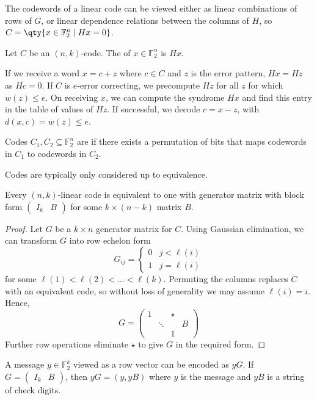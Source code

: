The codewords of a linear code can be viewed either as linear combinations of rows of $G$, or linear dependence relations between the columns of $H$, so $C = \qty{x \in \mathbb F_2^n \mid H x = 0}$.
\begin{definition}
    Let $C$ be an $(n, k)$-code.
    The  of $x \in \mathbb F_2^n$ is $Hx$.
\end{definition}
If we receive a word $x = c + z$ where $c \in C$ and $z$ is the error pattern, $Hx = Hz$ as $Hc = 0$.
If $C$ is $e$-error correcting, we precompute $Hz$ for all $z$ for which $w(z) \leq e$.
On receiving $x$, we can compute the syndrome $Hx$ and find this entry in the table of values of $Hz$.
If successful, we decode $c = x - z$, with $d(x,c) = w(z) \leq e$.
\begin{definition}
    Codes $C_1, C_2 \subseteq \mathbb F_2^n$ are  if there exists a permutation of bits that maps codewords in $C_1$ to codewords in $C_2$.
\end{definition}
Codes are typically only considered up to equivalence.
\begin{lemma}
    Every $(n, k)$-linear code is equivalent to one with generator matrix with block form $\begin{pmatrix}
        I_k & B
    \end{pmatrix}$ for some $k \times (n - k)$ matrix $B$.
\end{lemma}
\begin{proof}
    Let $G$ be a $k \times n$ generator matrix for $C$.
    Using Gaussian elimination, we can transform $G$ into row echelon form
    \[ G_{ij} = \begin{cases}
        0 & j < \ell(i) \\
        1 & j = \ell(i)
    \end{cases} \]
    for some $\ell(1) < \ell(2) < \dots < \ell(k)$.
    Permuting the columns replaces $C$ with an equivalent code, so without loss of generality we may assume $\ell(i) = i$.
    Hence,
    \[ G = \begin{pmatrix}
        1 & & \star \\
        & \ddots & & B \\
        & & 1
    \end{pmatrix} \]
    Further row operations eliminate $\star$ to give $G$ in the required form.
\end{proof}
A message $y \in \mathbb F_2^k$ viewed as a row vector can be encoded as $yG$.
If $G = \begin{pmatrix}
    I_k & B
\end{pmatrix}$, then $yG = (y, yB)$ where $y$ is the message and $yB$ is a string of check digits.
